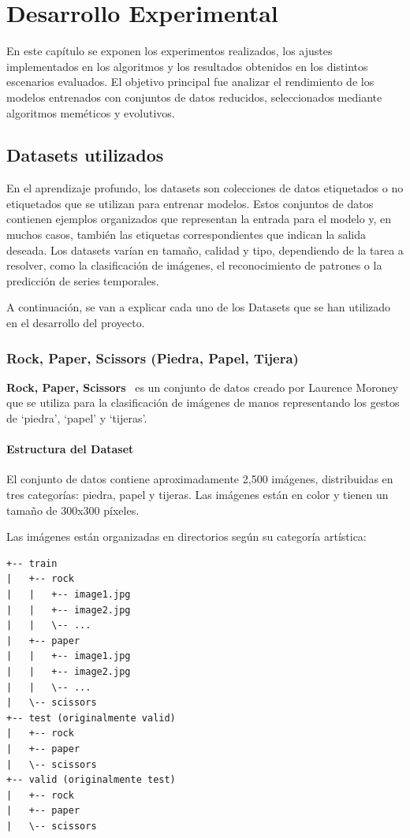 
\chapter{Desarrollo Experimental}\label{ch:desarrollo-experimental}
En este capítulo se exponen los experimentos realizados, los ajustes implementados en los algoritmos y los resultados
obtenidos en los distintos escenarios evaluados.
El objetivo principal fue analizar el rendimiento de los modelos entrenados con conjuntos de datos reducidos,
seleccionados mediante algoritmos meméticos y evolutivos.

\section{Datasets utilizados}\label{sec:datasets}
En el aprendizaje profundo, los datasets son colecciones de datos etiquetados o no etiquetados que se utilizan para
entrenar modelos.
Estos conjuntos de datos contienen ejemplos organizados que representan la entrada para el modelo y, en muchos casos,
también las etiquetas correspondientes que indican la salida deseada.
Los datasets varían en tamaño, calidad y tipo, dependiendo de la tarea a resolver, como la clasificación de imágenes,
el reconocimiento de patrones o la predicción de series temporales.


A continuación, se van a explicar cada uno de los Datasets que se han utilizado en el desarrollo del proyecto.

\subsection{Rock, Paper, Scissors (Piedra, Papel, Tijera)}\label{subsec:rock-paper-scissors}
\textbf{Rock, Paper, Scissors}~\cite{RockPaperScissors} es un conjunto de datos creado por Laurence Moroney
que se utiliza para la clasificación de imágenes de manos representando los gestos de `piedra', `papel' y `tijeras'.

\subsubsection{Estructura del Dataset}
El conjunto de datos contiene aproximadamente 2,500 imágenes, distribuidas en tres categorías: piedra, papel y tijeras.
Las imágenes están en color y tienen un tamaño de 300x300 píxeles.

Las imágenes están organizadas en directorios según su categoría artística:
\begin{verbatim}
+-- train
|   +-- rock
|   |   +-- image1.jpg
|   |   +-- image2.jpg
|   |   \-- ...
|   +-- paper
|   |   +-- image1.jpg
|   |   +-- image2.jpg
|   |   \-- ...
|   \-- scissors
+-- test (originalmente valid)
|   +-- rock
|   +-- paper
|   \-- scissors
+-- valid (originalmente test)
|   +-- rock
|   +-- paper
|   \-- scissors
\end{verbatim}


